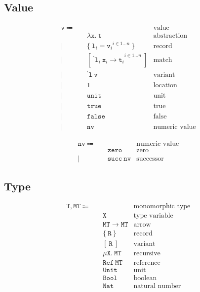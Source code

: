 \documentclass{report}
\newcommand{\code}{\mathtt}
\newcommand{\backtick}{{}^{\backprime}}
\begin{document}
\subsection{Value}

\begin{align*}
\code{v} \Coloneqq \quad & & \text{value} \\
& \code{\lambda x.\ t} & \text{abstraction} \\
| \quad & \{\ {\code{l}_i = \code{v}_i}^{i \in 1\dots n}\ \} & \text{record} \\
| \quad & [ {\code{\ \backtick l}_i\ \code{x}_i \rightarrow \code{t}_i}^{i \in 1\dots n} \ ] & \text{match} \\
| \quad & \code{\backtick l\ v} & \text{variant} \\
| \quad & \code{l} & \text{location} \\
| \quad & \code{unit} & \text{unit} \\
| \quad & \code{true} & \text{true} \\
| \quad & \code{false} & \text{false} \\
| \quad & \code{nv} & \text{numeric value}
\end{align*}

\begin{align*}
\code{nv} \Coloneqq \quad & & \text{numeric value} \\
& \code{zero} & \text{zero} \\
| \quad & \code{succ\ nv} & \text{successor}
\end{align*}

\subsection{Type}

\begin{align*}
\code{T, MT} \Coloneqq \quad & & \text{monomorphic type} \\
& \code{X} & \text{type variable} \\
& \code{MT \rightarrow MT} & \text{arrow} \\
& \code{\{\ R\ \}} & \text{record} \\
& \code{[\ R\ ]} & \text{variant} \\
& \code{\mu X.\ MT} & \text{recursive} \\
& \code{Ref\ MT} & \text{reference} \\
& \code{Unit} & \text{unit} \\
& \code{Bool} & \text{boolean} \\
& \code{Nat} & \text{natural number}
\end{align*}
\end{document}
